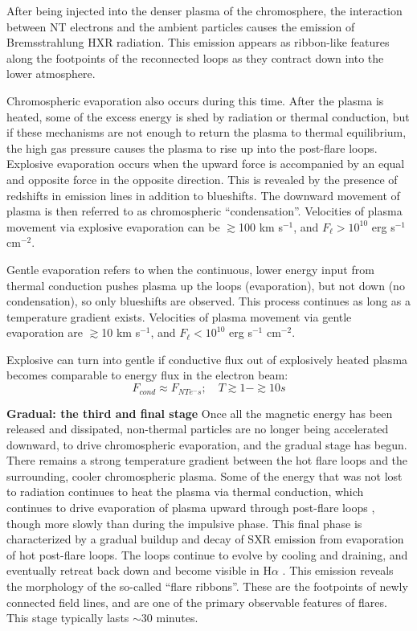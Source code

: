 After being injected into the denser plasma of the chromosphere,
the interaction between NT electrons and the ambient particles causes
the emission of Bremsstrahlung HXR radiation.
This emission appears as ribbon-like features along the footpoints
of the reconnected loops as they contract down into the lower atmosphere.

Chromospheric evaporation also occurs during this time.
After the plasma is heated, some of the excess energy is shed by
radiation or thermal conduction, but if these mechanisms are not enough
to return the plasma to thermal equilibrium, the high gas pressure causes
the plasma to rise up into the post-flare loops.
Explosive evaporation occurs when the upward force is accompanied by
an equal and opposite force in the opposite direction.
This is revealed by the presence of redshifts in emission lines in
addition to blueshifts. The downward movement of plasma is then
referred to as chromospheric ``condensation''.
Velocities of plasma movement via explosive evaporation can be
$\gtrsim$100 km s$^{-1}$, and $F_{\ell} > 10^{10}$ erg s$^{-1}$ cm$^{-2}$.

Gentle evaporation refers to
when the continuous, lower energy input from thermal conduction
pushes plasma up the loops (evaporation), but not down (no condensation),
so only blueshifts are observed.
This process continues as long as a temperature gradient exists.
Velocities of plasma movement via gentle evaporation are
$\gtrsim$10 km s$^{-1}$, and $F_{\ell} < 10^{10}$ erg s$^{-1}$ cm$^{-2}$.

Explosive can turn into gentle if conductive flux out of explosively heated
plasma becomes comparable to energy flux in the electron beam:
\[
    F_{cond} \approx F_{NTe^{-}s}; \quad T \gtrsim 1 - \gtrsim 10s
\]



\textbf{Gradual: the third and final stage}\quad
Once all the magnetic energy has been released and dissipated,
non-thermal particles are no longer being accelerated downward,
to drive chromospheric evaporation, and
the gradual stage has begun.
There remains a strong temperature gradient between the hot flare loops and
the surrounding, cooler chromospheric plasma.
Some of the energy that
was not lost to radiation continues to heat the plasma via thermal
conduction, which continues to drive evaporation of plasma upward
through post-flare loops \citep{Battaglia2015}, though more slowly
than during the impulsive phase. This final phase is characterized by
a gradual buildup and decay of SXR emission from evaporation of hot
post-flare loops. The loops continue to evolve by cooling and
draining, and eventually retreat back down and become visible in
H$\alpha$ \citep{Hudson2007}. This emission reveals the morphology of
the so-called ``flare ribbons''. These are the footpoints of newly
connected field lines, and are one of the primary observable features
of flares. This stage typically lasts $\sim$30 minutes.

